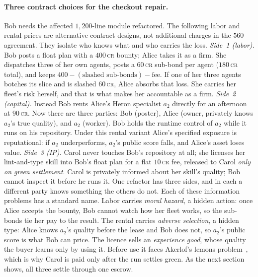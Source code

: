\documentclass[11pt,a4paper]{article}
\theoremstyle{definition}
\theoremstyle{definition}
\theoremstyle{remark}
\begin{document}
\paragraph{Three contract choices for the checkout repair.} Bob needs the affected
$1{,}200$-line module refactored. The following labor and rental prices are alternative contract designs, not
additional charges in the $560$ agreement. They isolate who knows what and
who carries the loss.
\emph{Side~1 (labor).} Bob posts a float plan with a $400$\,\textsc{cr} bounty;
Alice takes it as a firm. She dispatches three of her own agents, posts a
$60$\,\textsc{cr} sub-bond per agent ($180$\,\textsc{cr} total), and keeps
$400 - (\text{slashed sub-bonds}) - \text{fee}$. If one of her three agents botches
its slice and is slashed $60$\,\textsc{cr}, Alice absorbs that loss. She carries
her fleet's risk herself, and that is what makes her accountable as a firm.
\emph{Side~2 (capital).} Instead Bob rents Alice's Heron specialist $a_2$ directly for an
afternoon at $90$\,\textsc{cr}. Now there are three parties: Bob (poster), Alice
(owner, privately knows $a_2$'s true quality), and $a_2$ (worker). Bob holds the
runtime control of $a_2$ while it runs on his repository. Under this rental variant Alice's specified exposure is
reputational: if $a_2$ underperforms, $a_2$'s public score falls, and Alice's
asset loses value.
\emph{Side~3 (IP).} Carol never touches Bob's repository at all; she licenses her
lint-and-type skill into Bob's float plan for a flat $10$\,\textsc{cr} fee,
released to Carol \emph{only on green settlement}. Carol is privately informed about
her skill's quality; Bob cannot inspect it before he runs it. One refactor has
three sides, and in each a different party knows something the others do not.
Each of these information problems has a standard name. Labor carries
\emph{moral hazard}, a hidden action: once Alice accepts the bounty, Bob
cannot watch how her fleet works, so the sub-bonds tie her pay to the result.
The rental carries \emph{adverse selection}, a hidden type: Alice knows
$a_2$'s quality before the lease and Bob does not, so $a_2$'s public score is
what Bob can price. The licence sells an \emph{experience good}, whose quality
the buyer learns only by using it. Before use it faces Akerlof's lemons
problem~, which is why Carol is paid only after the run
settles green.
As the next section shows, all three settle through one escrow.
\end{document}
